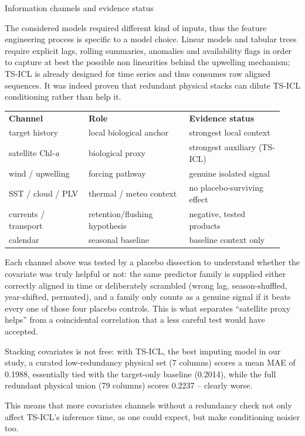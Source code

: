 \documentclass[10pt]{article}
\renewcommand{\arraystretch}{1.05}
\newlength{\colw}
\newcommand{\smallbody}[1]{{\RaggedRight\fontsize{16.3}{18.3}\selectfont\color{dark}#1\par}}
\newcommand{\tblhead}[1]{\bfseries\color{white}#1}
\begin{document}
\begin{minipage}[t]{\colw}
\begin{panel}[height=20.5cm]{Information channels and evidence status}
\smallbody{The considered models required different kind of inputs, thus the feature engineering process is specific to a model choice. Linear models and tabular trees require explicit lags, rolling summaries, anomalies and availability flags in order to capture at best the possible non linearities behind the upwelling mechanism; TS-ICL is already designed for time series and thus consumes raw aligned sequences. It was indeed proven that redundant physical stacks can dilute TS-ICL conditioning rather than help it.}
\vspace{0.7cm}
{\fontsize{12.6}{14.0}\selectfont
\renewcommand{\arraystretch}{1.38}
\begin{tabular}{@{}p{0.27\linewidth}p{0.34\linewidth}p{0.32\linewidth}@{}}
\rowcolor{navy}\tblhead{Channel} & \tblhead{Role} & \tblhead{Evidence status}\\
\rowcolor{softgreen}target history & local biological anchor & strongest local context\\
\rowcolor{softgreen}satellite Chl-\textit{a} & biological proxy & strongest auxiliary (TS-ICL)\\
\rowcolor{softgreen}wind / upwelling & forcing pathway & genuine isolated signal\\
\rowcolor{softgray}SST / cloud / PLV & thermal / meteo context & no placebo-surviving effect\\
\rowcolor{softred}currents / transport & retention/flushing hypothesis & negative, tested products\\
\rowcolor{softgray}calendar & seasonal baseline & baseline context only\\
\end{tabular}}
\vspace{1cm}

\smallbody{Each channel above was tested by a placebo dissection to understand whether the covariate was truly helpful or not: the same predictor family is supplied either correctly aligned in time or deliberately scrambled (wrong lag, season-shuffled, year-shifted, permuted), and a family only counts as a genuine signal if it beats every one of those four placebo controls. This is what separates ``satellite proxy helps'' from a coincidental correlation that a less careful test would have accepted.}
\vspace{0.5cm}
\smallbody{Stacking covariates is not free: with TS-ICL, the best imputing model in our study, a curated low-redundancy physical set (7 columns) scores a mean MAE of 0.1988, essentially tied with the target-only baseline (0.2014), while the full redundant physical union (79 columns) scores 0.2237 -- clearly worse.}
\vspace{0.5cm}
\smallbody{This means that more covariates channels without a redundancy check not only affect TS-ICL's inference time, as one could expect, but make conditioning noisier too.}
\end{panel}
\vspace{0.20cm}


\end{minipage}
\end{document}
